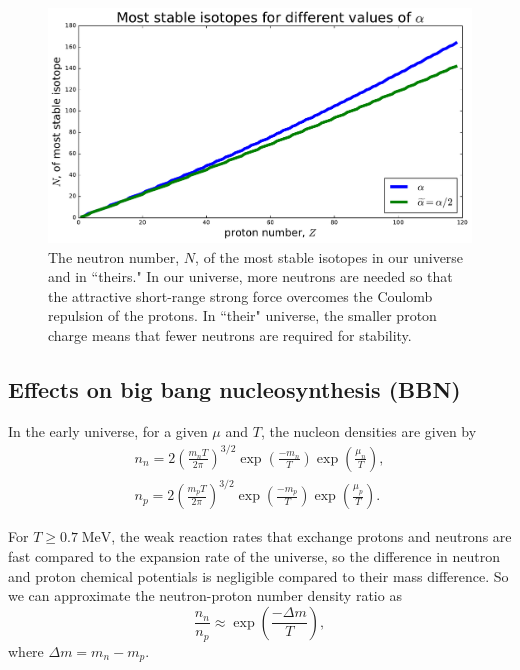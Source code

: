 \documentclass[%
 reprint,
 amsmath,amssymb,
 aps,
]{revtex4-1}
\begin{document}
\begin{figure}[h!]
	\centering
	\includegraphics[width=\linewidth]{fig/stable_isotopes.pdf}
	\caption{\label{fig:stable_isotopes}The neutron number, $N$, of the most stable isotopes in our universe and in ``theirs." In our universe, more neutrons are needed so that the attractive short-range strong force overcomes the Coulomb repulsion of the protons. In ``their" universe, the smaller proton charge means that fewer neutrons are required for stability.}
\end{figure}

\subsection{\label{sec:bbn}Effects on big bang nucleosynthesis (BBN)}

In the early universe, for a given $\mu$ and $T$, the nucleon densities are given by\cite{ReddyLectureNotes}
\begin{align}
	n_n = 2 \left( \frac{m_n T}{2 \pi} \right)^{3/2}
	\exp\left( \frac{-m_n}{T} \right) \exp\left( \frac{\mu_n}{T} \right), \\
	n_p = 2 \left( \frac{m_p T}{2 \pi} \right)^{3/2}
	\exp\left( \frac{-m_p}{T} \right) \exp\left( \frac{\mu_p}{T} \right).
\end{align}

For $T \ge 0.7 \; \text{MeV}$, the weak reaction rates that exchange protons and neutrons are fast compared to the expansion rate of the universe, so the difference in neutron and proton chemical potentials is negligible compared to their mass difference. So we can approximate the neutron-proton number density ratio as
\begin{equation}
	\frac{n_n}{n_p} \approx \exp \left( \frac{- \Delta m}{T} \right),
\end{equation}
where $\Delta m = m_n - m_p$.\cite{ReddyLectureNotes}
\end{document}
